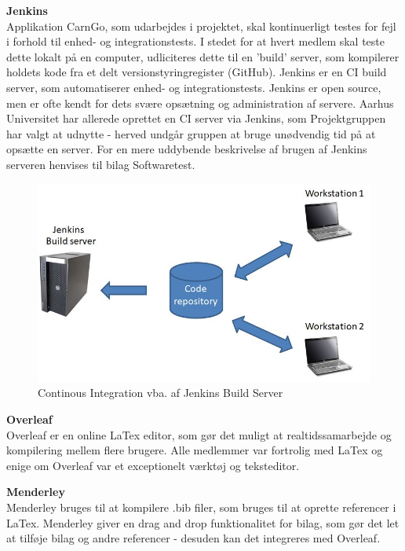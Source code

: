 \documentclass[a4paper,12pt,fleqn,oneside]{article}
\begin{document}
\textbf{Jenkins}\\
Applikation CarnGo, som udarbejdes i projektet, skal kontinuerligt testes for fejl i forhold til enhed- og integrationstests. I stedet for at hvert medlem skal teste dette lokalt på en computer, udliciteres dette til en 'build' server, som kompilerer holdets kode fra et delt versionstyringregister (GitHub). Jenkins er en CI build server, som automatiserer enhed- og integrationstests. Jenkins er open source, men er ofte kendt for dets svære opsætning og administration af servere. Aarhus Universitet har allerede oprettet en CI server via Jenkins, som Projektgruppen har valgt at udnytte - herved undgår gruppen at bruge unødvendig tid på at opsætte en server. For en mere uddybende beskrivelse af brugen af Jenkins serveren henvises til bilag Softwaretest.
\begin{figure}[H]
    \centering
    \includegraphics[width=\textwidth]{ProcesDokument/graphics/Jenkins.jpg}
    \caption{Continous Integration vba. af Jenkins Build Server}
    \label{fig:jenkins}
\end{figure}

\textbf{Overleaf}\\
Overleaf er en online LaTex editor, som gør det muligt at realtidssamarbejde og kompilering mellem flere brugere. Alle medlemmer var fortrolig med LaTex og enige om Overleaf var et exceptionelt værktøj og teksteditor.  

\textbf{Menderley}\\
Menderley bruges til at kompilere .bib filer, som bruges til at oprette referencer i LaTex. Menderley giver en drag and drop funktionalitet for bilag, som gør det let at tilføje bilag og andre referencer - desuden kan det integreres med Overleaf. 
\end{document}
